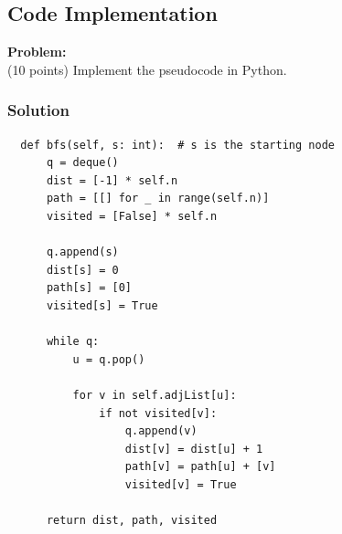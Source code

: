 \documentclass[notitlepage]{article}
\begin{document}
\subsection{Code Implementation}

\begin{framed}
  \textbf{Problem:}\\
  (10 points) Implement the pseudocode in Python.
\end{framed}

\subsubsection{Solution}

\begin{verbatim}
  def bfs(self, s: int):  # s is the starting node
      q = deque()
      dist = [-1] * self.n
      path = [[] for _ in range(self.n)]
      visited = [False] * self.n

      q.append(s)
      dist[s] = 0
      path[s] = [0]
      visited[s] = True

      while q:
          u = q.pop()

          for v in self.adjList[u]:
              if not visited[v]:
                  q.append(v)
                  dist[v] = dist[u] + 1
                  path[v] = path[u] + [v]
                  visited[v] = True

      return dist, path, visited
\end{verbatim}

\pagebreak


\end{document}
